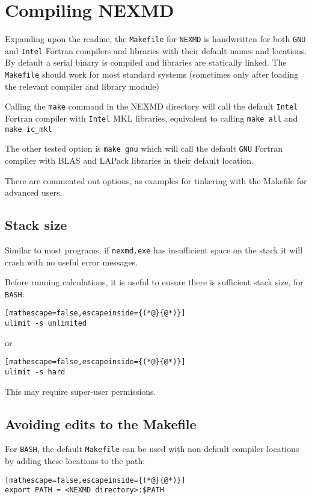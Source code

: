 \section{Compiling NEXMD}

Expanding upon the readme, the \verb+Makefile+ for \verb+NEXMD+ is handwritten for both \verb+GNU+ and \verb+Intel+ Fortran compilers and libraries with their default names and locations. 
By default a serial binary is compiled and libraries are statically linked.
The \verb+Makefile+
should work for most standard systems (sometimes only after loading
the relevant compiler and library module) 

Calling the \verb+make+ command in the NEXMD directory will call the default \verb+Intel+ Fortran compiler with \verb+Intel+ MKL libraries, equivalent to calling 
\verb+make all+ and \verb+make ic_mkl+

The other tested option is \verb+make gnu+ which will call the default \verb+GNU+ Fortran compiler with BLAS and LAPack libraries in their default
location.

There are commented out options, as examples for tinkering with
the Makefile for advanced users. 

\subsection{Stack size}

Similar to most programs, if \verb+nexmd.exe+ has insufficient space on the
stack it will crash with no useful error messages.

Before running calculations, it is useful to ensure there is sufficient
stack size, for \verb+BASH+:
\begin{lstlisting}[mathescape=false,escapeinside={(*@}{@*)}]
ulimit -s unlimited
\end{lstlisting}
or
\begin{lstlisting}[mathescape=false,escapeinside={(*@}{@*)}]
ulimit -s hard
\end{lstlisting}

This may require super-user permissions.

\subsection{Avoiding edits to the Makefile}
For \verb+BASH+,
the default \verb+Makefile+ can be used with non-default compiler locations by adding these locations to the path:
\begin{lstlisting}[mathescape=false,escapeinside={(*@}{@*)}]
export PATH = <NEXMD directory>:$PATH
\end{lstlisting}

